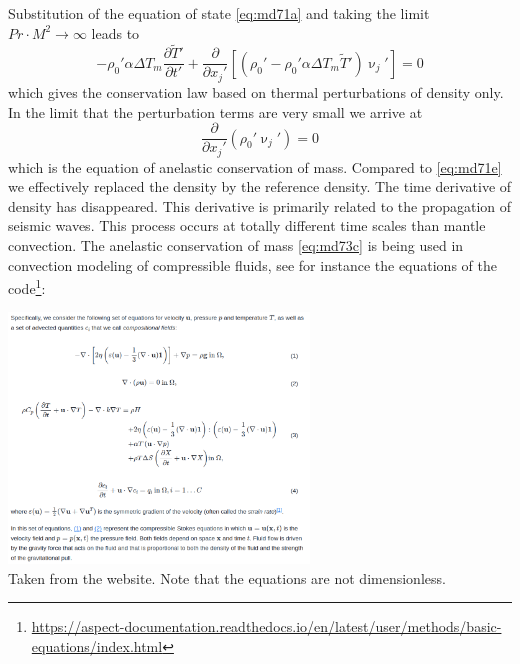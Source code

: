 \vspace{0.5cm}


\vspace{0.5cm}

Substitution of the equation of state \eqref{eq:md71a} 
and taking the limit $Pr \cdot M^2 \rightarrow \infty$ leads to
\begin{equation}
-\rho_0' \alpha \Delta T_m \frac{\partial {\tilde T}'  }{\partial t'} + 
\frac{\partial }{\partial x_j'} 
\left[
(\rho_0' - \rho_0' \alpha \Delta T_m {\tilde T}') \upnu_j'
\right] = 0
\label{eq:md73b}
\end{equation}
which gives the conservation law based on thermal perturbations of density only. In the
limit that the perturbation terms are very small we arrive at
\begin{equation}
\frac{\partial }{\partial x_j'} ( \rho_0' \upnu_j' ) =0
\label{eq:md73c}
\end{equation}
which is the equation of anelastic conservation of mass. Compared to \eqref{eq:md71e} we
effectively replaced the density by the reference density. The time derivative of density
has disappeared. This derivative is primarily related to the propagation of seismic waves.
This process occurs at totally different time scales than mantle convection. The anelastic
conservation of mass \eqref{eq:md73c} is being used in convection modeling of compressible fluids,
see for instance the equations of the \aspect code\footnote{\url{https://aspect-documentation.readthedocs.io/en/latest/user/methods/basic-equations/index.html}}:

\begin{center}
\includegraphics[width=8cm]{images/chapter_md/aspect_eqs}\\
{\captionfont Taken from the \aspect website. Note that the equations are not dimensionless.}
\end{center}


